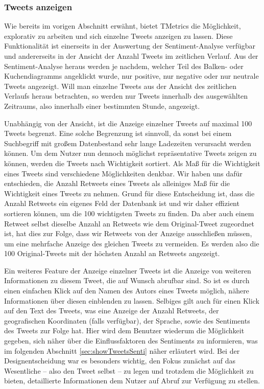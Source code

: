 \subsubsection{Tweets anzeigen}
\label{sec:showTweets}
Wie bereits im vorigen Abschnitt erwähnt, bietet TMetrics die Möglichkeit, explorativ zu arbeiten und sich einzelne Tweets anzeigen zu lassen. Diese Funktionalität ist einerseits in der Auswertung der Sentiment-Analyse verfügbar und andererseits in der Ansicht der Anzahl Tweets im zeitlichen Verlauf. Aus der Sentiment-Analyse heraus werden je nachdem, welcher Teil des Balken- oder Kuchendiagramms angeklickt wurde, nur positive, nur negative oder nur neutrale Tweets angezeigt. Will man einzelne Tweets aus der Ansicht des zeitlichen Verlaufs heraus betrachten, so werden nur Tweets innerhalb des ausgewählten Zeitraums, also innerhalb einer bestimmten Stunde, angezeigt.

Unabhängig von der Ansicht, ist die Anzeige einzelner Tweets auf maximal 100 Tweets begrenzt. Eine solche Begrenzung ist sinnvoll, da sonst bei einem Suchbegriff mit großem Datenbestand sehr lange Ladezeiten verursacht werden können.
Um dem Nutzer nun dennoch möglichst repräsentative Tweets zeigen zu können, werden die Tweets nach Wichtigkeit sortiert. Als Maß für die Wichtigkeit eines Tweets sind verschiedene Möglichkeiten denkbar. Wir haben uns dafür entschieden, die Anzahl Retweets eines Tweets als alleiniges Maß für die Wichtigkeit eines Tweets zu nehmen. Grund für diese Entscheidung ist, dass die Anzahl Retweets ein eigenes Feld der Datenbank ist und wir daher effizient sortieren können, um die 100 wichtigsten Tweets zu finden. Da aber auch einem Retweet selbst dieselbe Anzahl an Retweets wie dem Original-Tweet zugeordnet ist, hat dies zur Folge, dass wir Retweets von der Anzeige ausschließen müssen, um eine mehrfache Anzeige des gleichen Tweets zu vermeiden. Es werden also die 100 Original-Tweets mit der höchsten Anzahl an Retweets angezeigt.

Ein weiteres Feature der Anzeige einzelner Tweets ist die Anzeige von weiteren Informationen zu diesem Tweet, die auf Wunsch abrufbar sind. So ist es durch einen einfachen Klick auf den Namen des Autors eines Tweets möglich, nähere Informationen über diesen einblenden zu lassen. Selbiges gilt auch für einen Klick auf den Text des Tweets, was eine Anzeige der Anzahl Retweets, der geografischen Koordinaten (falls verfügbar), der Sprache, sowie des Sentiments des Tweets zur Folge hat. Hier wird dem Benutzer wiederum die Möglichkeit gegeben, sich näher über die Einflussfaktoren des Sentiments zu informieren, was im folgenden Abschnitt \ref{sec:showTweetsSenti} näher erläutert wird. Bei der Designentscheidung war es besonders wichtig, den Fokus zunächst auf das Wesentliche -- also den Tweet selbst -- zu legen und trotzdem die Möglichkeit zu bieten, detaillierte Informationen dem Nutzer auf Abruf zur Verfügung zu stellen.

